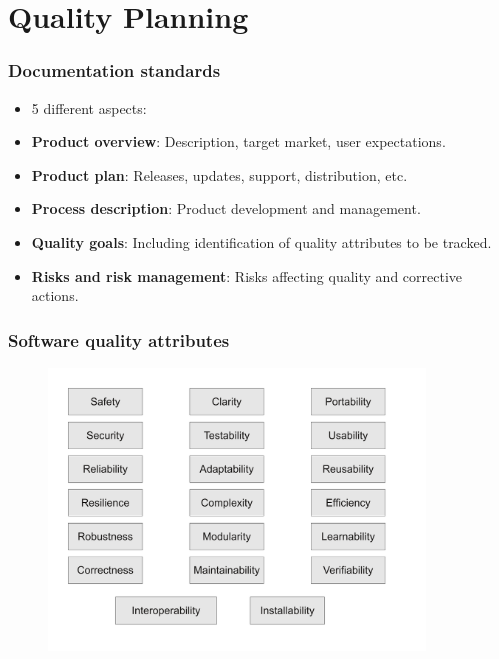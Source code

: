 \documentclass{beamer}
\begin{document}

\section{Quality Planning}


\begin{frame}
 \frametitle{Documentation standards}
 \begin{itemize}
 \item 5 different aspects:
 \item \textbf{Product overview}: Description, target market, user expectations.
 \item \textbf{Product plan}: Releases, updates, support, distribution, etc.
 \item \textbf{Process description}: Product development and management.
 \item \textbf{Quality goals}: Including identification of quality attributes to be tracked.
 \item \textbf{Risks and risk management}: Risks affecting quality and corrective actions.
 \end{itemize}
\end{frame}


\begin{frame}
\frametitle{Software quality attributes}
\begin{center}
\begin{figure}
 \includegraphics[height=7.5cm]{figs/quality-attributes.pdf}
\end{figure}
\end{center}
\end{frame}
\end{document}
